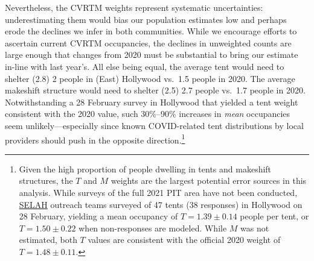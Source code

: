 \documentclass[11pt]{article}
\def\selah{SELAH}
\begin{document}
Nevertheless, the CVRTM weights represent systematic uncertainties: underestimating them would bias
our population estimates low and perhaps erode the declines we infer in both communities. While we encourage
efforts to ascertain current CVRTM occupancies, the declines in unweighted counts are large enough that 
changes from 2020 must be substantial to bring our estimate in-line with last year's. All else being equal, 
the average tent would need to shelter (2.8) 2 people in (East) Hollywood vs.\ 1.5 people in 2020. The average 
makeshift structure would need to shelter (2.5) 2.7 people vs.\ 1.7 people in 2020. Notwithstanding
a 28 February survey in Hollywood that yielded a tent weight consistent with the 2020 value, 
such 30\%--90\% increases in {\it mean} occupancies seem unlikely---especially since known COVID-related
tent distributions by local providers should push in the opposite direction.\footnote{Given the high proportion of people dwelling in tents
and makeshift structures, the $T$ and $M$ weights are the largest potential error sources in this analysis. While 
surveys of the full 2021 PIT area have not been conducted, \href{https://selahnch.org}{\selah} outreach teams 
surveyed of 47 tents (38 responses) in Hollywood on 28 February, yielding a mean occupancy of 
$T=1.39\pm0.14$ people per tent, or $T=1.50\pm0.22$ when non-responses are modeled. While $M$ was
not estimated, both $T$ values are consistent with the official 2020 weight of $T=1.48\pm0.11$.}
\end{document}
